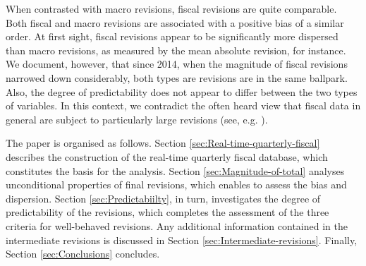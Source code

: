 When contrasted with macro revisions, fiscal revisions are quite comparable. Both fiscal and macro revisions are associated with a positive bias of a similar order. At first sight, fiscal revisions appear to be significantly more dispersed than macro revisions, as measured by the mean absolute revision, for instance. We document, however, that since 2014, when the magnitude of fiscal revisions narrowed down considerably, both types are revisions are in the same ballpark. Also, the degree of predictability does not appear to differ between the two types of variables. In this context, we contradict the often heard view that fiscal data in general are subject to particularly large revisions (see, e.g. \citet{Cimadomo_2016_jes}).

The paper is organised as follows. Section \ref{sec:Real-time-quarterly-fiscal} describes the construction of the real-time quarterly fiscal database, which constitutes the basis for the analysis.
Section \ref{sec:Magnitude-of-total} analyses unconditional properties of final revisions, which enables to assess the bias and dispersion. Section \ref{sec:Predictabiilty}, in turn, investigates the degree of predictability of the revisions, which completes the assessment of the three criteria for well-behaved revisions. Any additional information contained in the intermediate revisions is discussed in Section \ref{sec:Intermediate-revisions}. Finally, Section \ref{sec:Conclusions} concludes.
